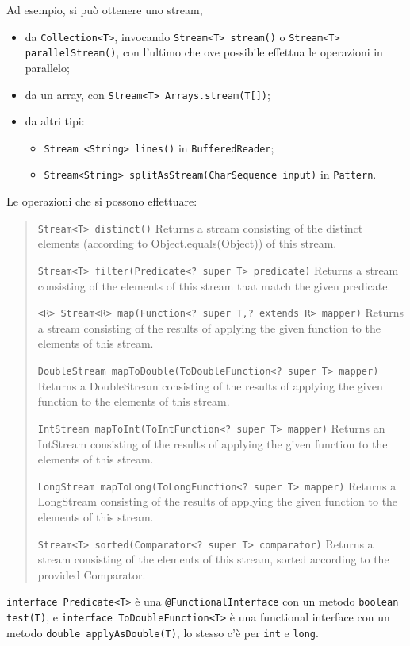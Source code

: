 \documentclass[\fontsizeclass,twocolumn]{\classname}
\theoremstyle{definition}
\theoremstyle{definition}
\begin{document}
Ad esempio, si può ottenere uno stream, 
\begin{itemize}
    \item da \texttt{Collection<T>}, invocando \texttt{Stream<T> stream()} o
        \texttt{Stream<T> parallelStream()}, con l'ultimo che ove possibile
        effettua le operazioni in parallelo;
    \item da un array, con \texttt{Stream<T> Arrays.stream(T[])};
    \item da altri tipi:
\begin{itemize}
    \item \texttt{Stream <String> lines()} in \texttt{BufferedReader};
    \item \texttt{Stream<String> splitAsStream(CharSequence input)} in
        \texttt{Pattern}.
\end{itemize}
\end{itemize}

Le operazioni che si possono effettuare:
\begin{quote}
    \footnotesize{\texttt{Stream<T> 	distinct()} 	Returns a stream consisting of the distinct elements (according to Object.equals(Object)) of this stream.

\texttt{Stream<T> 	filter(Predicate<? super T> predicate)} 	Returns a stream consisting of the elements of this stream that match the given predicate.

\texttt{<R> Stream<R> 	map(Function<? super T,? extends R> mapper)} 	Returns a stream consisting of the results of applying the given function to the elements of this stream.

\texttt{DoubleStream 	mapToDouble(ToDoubleFunction<? super T> mapper)} 	Returns a DoubleStream consisting of the results of applying the given function to the elements of this stream.

\texttt{IntStream 	mapToInt(ToIntFunction<? super T> mapper)} 	Returns an IntStream consisting of the results of applying the given function to the elements of this stream.

\texttt{LongStream 	mapToLong(ToLongFunction<? super T> mapper)} 	Returns a LongStream consisting of the results of applying the given function to the elements of this stream.

\texttt{Stream<T> 	sorted(Comparator<? super T> comparator)} 	Returns a stream consisting of the elements of this stream, sorted according to the provided Comparator.}
\end{quote}

\texttt{interface Predicate<T>} è una \texttt{@FunctionalInterface} con un
metodo \texttt{boolean test(T)}, e \texttt{interface ToDoubleFunction<T>} è una
functional interface con un metodo \texttt{double applyAsDouble(T)}, lo stesso
c'è per \texttt{int} e \texttt{long}.
\end{document}
